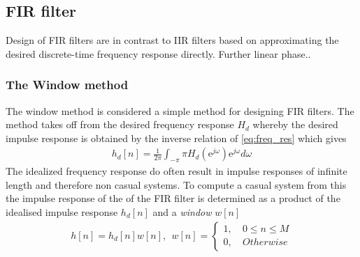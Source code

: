 %
%
 

\subsection{FIR filter}
Design of FIR filters are in contrast to IIR filters based on approximating the desired discrete-time frequency response directly. Further linear phase..  

\subsubsection{The Window method}
The window method is considered a simple method for designing FIR filters. The method takes off from the desired frequency response $H_d$ whereby the desired impulse response is obtained by the inverse relation of \eqref{eq:freq_res} which gives 
\begin{align}
h_d[n]=\frac{1}{2\pi}\int_{-\pi}{\pi} H_d(\text{e}^{j\omega})\text{e}^{j\omega} d\omega
\end{align}
The idealized frequency response do often result in impulse responses of infinite length and therefore non casual systems. To compute a casual system from this the impulse response of the of the FIR filter is determined as a product of the idealised impulse response $h_d[n]$ and a \textit{window} $w[n]$ 
\begin{align}
h[n]=h_d[n]w[n], \ \ w[n] =
\left\{ \begin{matrix}
1, &\ 0 \leq n \leq M \\
0, &\ Otherwise
\end{matrix}\right.
\end{align}       

